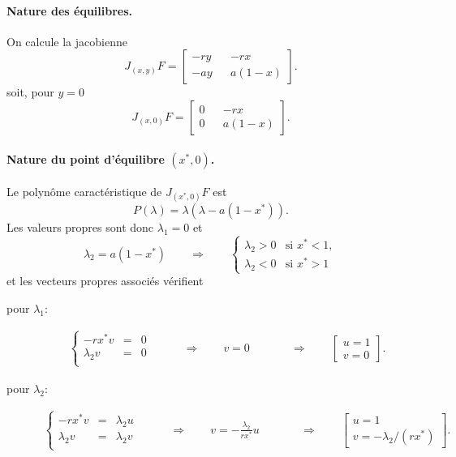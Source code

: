 \paragraph*{Nature des équilibres.}
On calcule la jacobienne
$$
J_{(x, y)}F = 
  \left[\begin{array}{ccc} 
    - r y & & -r x \\
    - a y & & a (1 - x)
  \end{array}\right].
$$
soit, pour $y = 0$
$$
J_{(x, 0)}F = 
  \left[\begin{array}{ccc} 
    0 & & -r x \\
    0 & & a (1 - x)
  \end{array}\right].
$$

\paragraph*{Nature du point d'équilibre $(x^*, 0)$.}
Le polynôme caractéristique de $J_{(x^*, 0)}F$ est
$$
P(\lambda) = \lambda (\lambda - a (1 - x^*)).
$$
Les valeurs propres sont donc $\lambda_1 = 0$ et 
$$
\lambda_2 = a (1 - x^*) 
\qquad \Rightarrow \qquad 
\left\{\begin{array}{ll} 
  \lambda_2 > 0 & \text{si } x^* < 1, \\
  \lambda_2 < 0 & \text{si } x^* > 1
\end{array} \right.
$$
et les vecteurs propres associés vérifient 
\begin{description}
  \item[pour $\lambda_1$:] 
  \begin{align*}
  \left\{\begin{array}{rcl}
      -r x^* v & = & 0 \\
      \lambda_2 v & = & 0 \\
    \end{array}\right.
    \qquad & \Rightarrow \qquad 
    v = 0 &
    \qquad & \Rightarrow \qquad 
    \left[\begin{array}{c} u=1 \\ v=0 \end{array}\right].
    \end{align*}
  \item[pour $\lambda_2$:]
    \begin{align*}
      \left\{\begin{array}{rcl}
          -r x^* v & = & \lambda_2 u \\
          \lambda_2 v & = & \lambda_2 v \\
        \end{array}\right.
        \qquad & \Rightarrow \qquad 
        v = - \frac{\lambda_2}{rx^*} u &
        \qquad & \Rightarrow \qquad 
        \left[\begin{array}{l} u=1 \\ v=-\lambda_2/(rx^*) \end{array}\right].
    \end{align*}  
\end{description}

